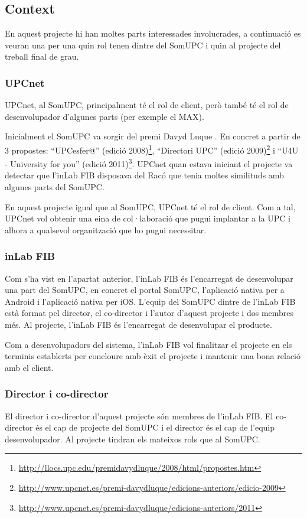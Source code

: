 \subsection{Context}

En aquest projecte hi han moltes parts interessades involucrades, a continuació es veuran una per una quin rol tenen dintre del SomUPC i quin al projecte del treball final de grau.

\subsubsection{UPCnet}
UPCnet, al SomUPC, principalment té el rol de client, però també té el rol de desenvolupador d'algunes parts (per exemple el MAX).

Inicialment el SomUPC va sorgir del premi Davyd Luque \cite{premi_upcnet}. En concret a partir de 3 propostes: ``UPCesfer@'' (edició 2008)\footnote{\url{http://llocs.upc.edu/premidavydluque/2008/html/propostes.htm}}, ``Directori UPC'' (edició 2009)\footnote{\url{http://www.upcnet.es/premi-davydluque/edicions-anteriors/edicio-2009}} i ``U4U - University for you'' (edició 2011)\footnote{\url{http://www.upcnet.es/premi-davydluque/edicions-anteriors/2011}}. UPCnet quan estava iniciant el projecte va detectar que l'inLab FIB\cite{inLabFIB} disposava del Racó que tenia moltes similituds amb algunes parts del SomUPC.

En aquest projecte igual que al SomUPC, UPCnet té el rol de client. Com a tal, UPCnet vol obtenir una eina de col·laboració que pugui implantar a la UPC i alhora a qualsevol organització que ho pugui necessitar.

\subsubsection{inLab FIB}
Com s'ha vist en l'apartat anterior, l'inLab FIB és l'encarregat de desenvolupar una part del SomUPC, en concret el portal SomUPC, l'aplicació nativa per a Android i l'aplicació nativa per iOS.
L'equip del SomUPC dintre de l'inLab FIB està format pel director, el co-director i l'autor d'aquest projecte i dos membres més.
Al projecte, l'inLab FIB és l'encarregat de desenvolupar el producte.

Com a desenvolupadors del sistema, l'inLab FIB vol finalitzar el projecte en els terminis establerts per concloure amb èxit el projecte i mantenir una bona relació amb el client.


\subsubsection{Director i co-director}
El director i co-director d'aquest projecte són membres de l'inLab FIB. El co-director és el cap de projecte del SomUPC i el director és el cap de l'equip desenvolupador.
Al projecte tindran els mateixos rols que al SomUPC.

